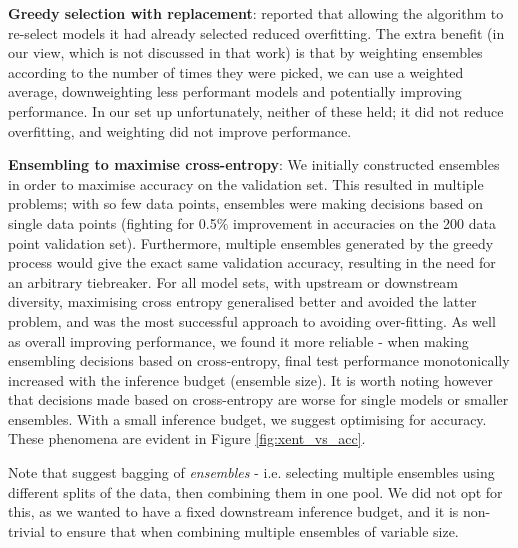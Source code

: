 \documentclass{article} \usepackage{iclr2021_conference,times}
\begin{document}
\textbf{Greedy selection with replacement}:
    \citet{caruana2004ensembleselection} reported that allowing the algorithm to re-select models it had already selected reduced overfitting. The extra benefit (in our view, which is not discussed in that work) is that by weighting ensembles according to the number of times they were picked, we can use a weighted average, downweighting less performant models and potentially improving performance. In our set up unfortunately, neither of these held; it did not reduce overfitting, and weighting did not improve performance.
    
\textbf{Ensembling to maximise cross-entropy}:
    We initially constructed ensembles in order to maximise accuracy on the validation set. This resulted in multiple problems; with so few data points, ensembles were making decisions based on single data points (fighting for 0.5\% improvement in accuracies on the 200 data point validation set). Furthermore, multiple ensembles generated by the greedy process would give the exact same validation accuracy, resulting in the need for an arbitrary tiebreaker. For all model sets, with upstream or downstream diversity, maximising cross entropy generalised better and avoided the latter problem, and was the most successful approach to avoiding over-fitting. As well as overall improving performance, we found it more reliable - when making ensembling decisions based on cross-entropy, final test performance monotonically increased with the inference budget (ensemble size). 
    It is worth noting however that decisions made based on cross-entropy are worse for single models or smaller ensembles. With a small inference budget, we suggest optimising for accuracy. These phenomena are evident in Figure \ref{fig:xent_vs_acc}.

Note that \citet{caruana2004ensembleselection} suggest bagging of \textit{ensembles} - i.e. selecting multiple ensembles using different splits of the data, then combining them in one pool. We did not opt for this, as we wanted to have a fixed downstream inference budget, and it is non-trivial to ensure that when combining multiple ensembles of variable size.

 
\end{document}
